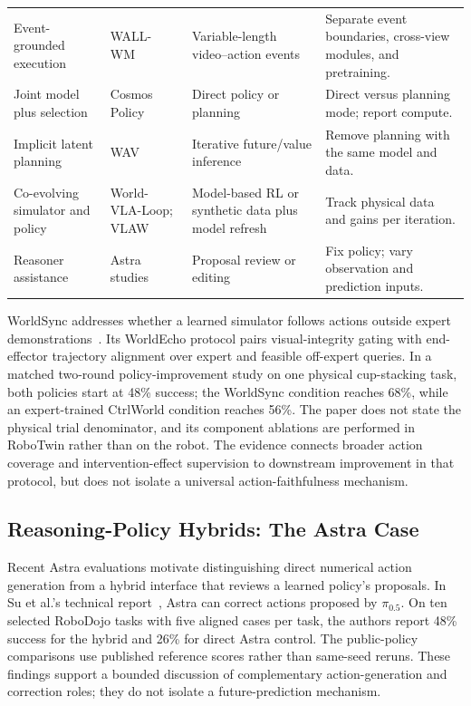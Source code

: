 \begin{table}[t]
\begin{tabularx}{\linewidth}{@{}>{\raggedright\arraybackslash}p{.17\linewidth}YYY@{}}
\addlinespace
Event-grounded execution & WALL-WM~\cite{li2026wallwm} & Variable-length video--action events & Separate event boundaries, cross-view modules, and pretraining. \\
\addlinespace
Joint model plus selection & Cosmos Policy~\cite{kim2026cosmospolicy} & Direct policy or planning & Direct versus planning mode; report compute. \\
\addlinespace
Implicit latent planning & WAV~\cite{li2026wav} & Iterative future/value inference & Remove planning with the same model and data. \\
\addlinespace
Co-evolving simulator and policy & World-VLA-Loop; VLAW~\cite{liu2026worldvlaloop,guo2026vlaw} & Model-based RL or synthetic data plus model refresh & Track physical data and gains per iteration. \\
\addlinespace
Reasoner assistance & Astra studies~\cite{su2026astra,galbot2026astra} & Proposal review or editing & Fix policy; vary observation and prediction inputs. \\
\bottomrule
\end{tabularx}
\end{table}

WorldSync addresses whether a learned simulator follows actions outside expert demonstrations~\cite{chen2026worldsync}. Its WorldEcho protocol pairs visual-integrity gating with end-effector trajectory alignment over expert and feasible off-expert queries. In a matched two-round policy-improvement study on one physical cup-stacking task, both policies start at 48\% success; the WorldSync condition reaches 68\%, while an expert-trained CtrlWorld condition reaches 56\%. The paper does not state the physical trial denominator, and its component ablations are performed in RoboTwin rather than on the robot. The evidence connects broader action coverage and intervention-effect supervision to downstream improvement in that protocol, but does not isolate a universal action-faithfulness mechanism.

\subsection{Reasoning-Policy Hybrids: The Astra Case}
Recent Astra evaluations motivate distinguishing direct numerical action generation from a hybrid interface that reviews a learned policy's proposals. In Su et al.'s technical report~\cite{su2026astra}, Astra can correct actions proposed by $\pi_{0.5}$. On ten selected RoboDojo tasks with five aligned cases per task, the authors report 48\% success for the hybrid and 26\% for direct Astra control. The public-policy comparisons use published reference scores rather than same-seed reruns. These findings support a bounded discussion of complementary action-generation and correction roles; they do not isolate a future-prediction mechanism.

